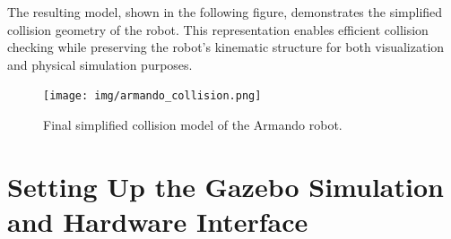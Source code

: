 \documentclass{article}
\begin{document}
\begin{enumerate}
\noindent The resulting model, shown in the following figure, demonstrates the simplified collision geometry of the robot. 
This representation enables efficient collision checking while preserving the robot’s kinematic structure for 
both visualization and physical simulation purposes.

\begin{figure}[h]
    \centering
    \texttt{[image: img/armando\_collision.png]}
    \caption{Final simplified collision model of the Armando robot.}
    \label{fig:armando_collision}
\end{figure}

\end{enumerate}
\pagebreak
\section{Setting Up the Gazebo Simulation and Hardware Interface}
\end{document}
